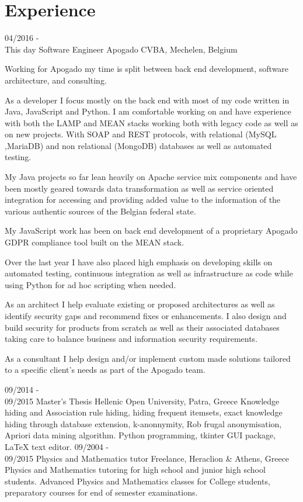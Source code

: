 \documentclass[]{friggeri-cv}
\begin{document}
\section{Experience}

\begin{entrylist}
  \entry
    {04/2016 - \\This day}
    {Software Engineer}
    {Apogado CVBA, Mechelen, Belgium}
    {Working for Apogado my time is split between back end development, software architecture, and consulting.\par
    \hspace{15pt}As a developer I focus mostly on the back end with most of my code written in Java, JavaScript and Python. I am comfortable working on and have experience with both the LAMP and MEAN stacks working both with legacy code as well as on new projects. With SOAP and REST protocols, with relational (MySQL ,MariaDB) and non relational (MongoDB) databases as well as automated testing.\par My Java projects so far lean heavily on Apache service mix components and have been mostly geared towards data transformation as well as service oriented integration for accessing and providing added value to the information of the various authentic sources of the Belgian federal state.\par My JavaScript work has been on back end development of a proprietary  Apogado GDPR compliance tool built on the MEAN stack. \par Over the last year I have also placed high emphasis on developing skills on automated testing, continuous integration as well as infrastructure as code while using Python for ad hoc scripting when needed.\par
    \hspace{15pt}As an architect I help evaluate existing or proposed architectures as well as identify security gaps and recommend fixes or enhancements. I also design and build security for products from scratch as well as their associated databases taking care to balance business and information security requirements.\par
    \hspace{15pt}As a consultant I help design and/or implement custom made solutions tailored to a specific client’s needs as part of the Apogado team.}
  \entry
    {09/2014 - \\09/2015}
    {Master's Thesis}
    {Hellenic Open University, Patra, Greece}
    {Knowledge hiding and Association rule hiding, hiding frequent itemsets, exact knowledge hiding through database extension, k-anonnymity, Rob frugal anonymisation, Apriori data mining algorithm. Python programming, tkinter GUI package, LaTeX text editor.}
  \entry
    {09/2004 - \\09/2015}
    {Physics and Mathematics tutor}
    {Freelance, Heraclion \& Athens, Greece}
    {Physics and Mathematics tutoring for high school and junior high school students. Advanced Physics and Mathematics classes for College students, preparatory courses for end of semester examinations. }
    
\end{entrylist}
\end{document}
